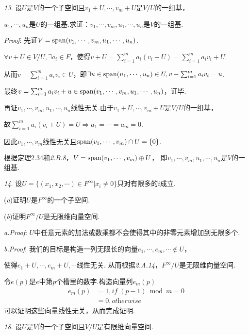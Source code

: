 \newpage

\textit{13.}
设$U$是$V$的一个子空间且$v_1+U,\cdots,v_m+U$是$V/U$的一组基，

$u_1,\cdots,u_n$是$U$的一组基.求证：$v_1,\cdots,v_m,u_1,\cdots,u_n$是$V$的一组基.

\textit{Proof}:
先证$V=\mathrm{span} (v_1,\cdots,v_m,u_1,\cdots,u_n)$.

$\forall v+U \in V/U, \exists a_i \in F$，使得$v+U=\sum_{i=1}^m a_i(v_i+U)=\sum_{i=1}^m a_iv_i+U$.

从而$v-\sum_{i=1}^m a_iv_i \in U$，即$\exists u \in \mathrm{span} (u_1,\cdots,u_n) \in U,v-\sum_{i=1}^m a_iv_i=u$.

最终$v=\sum_{i=1}^m a_iv_i+u \in \mathrm{span} (v_1,\cdots,v_m,u_1,\cdots,u_n)$，证毕.

再证$v_1,\cdots,v_m,u_1,\cdots,u_n$线性无关.由于$v_1+U,\cdots,v_m+U$是$V/U$的一组基，

故$\sum_{i=1}^m a_i(v_i+U)=U \Rightarrow a_1=\cdots=a_m=0$.

因此$v_1,\cdots,v_m$线性无关且$\mathrm{span} (v_1,\cdots,v_m) \cap U=\{0\}$.

根据定理2.34和\textit{2.B.8}，$V=\mathrm{span} (v_1,\cdots,v_m) \oplus U$，
即$v_1,\cdots,v_m,u_1,\cdots,u_n$是$V$的一组基.

\hspace*{\fill}

\textit{14.}
设$U=\{(x_1,x_2,\cdots)\in F^\infty | x_i \ne 0\}$只对有限多的$i$成立.

(\textit{a})证明$U$是$F^\infty$的一个子空间.

(\textit{b})证明$F^\infty /U$是无限维向量空间.

\textit{a.Proof}:
$U$中任意元素的加法或数乘都不会使得其中的非零元素增加到无限多个.

\textit{b.Proof}:
我们的目标是构造一列无限长的向量$e_1,\cdots,e_m,\cdots \notin U$，

使得$e_1+U,\cdots,e_m+U,\cdots$线性无关.
从而根据\textit{2.A.14}，$F^\infty /U$是无限维向量空间.

令$e(p)$是$e$中第$p$个槽里的数字.构造向量列$e_m(p)$
    \begin{align*}
        e_m(p) &=1,\textit{if} \; (p-1) \bmod m=0 \\
            &=0,\textit{otherwise}
    \end{align*}
可以证明这些向量线性无关，从而完成证明.

\newpage

\textit{18.}
设$U$是$V$的一个子空间且$V/U$是有限维向量空间.


